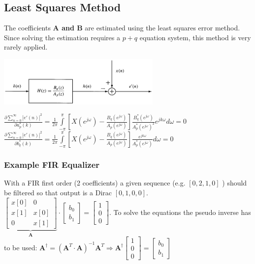 \subsection{Least Squares Method }
The coefficients \textbf{A and B} are estimated using the least squares error method.
Since solving the estimation requires a $p+q$ equation system, this method is very rarely applied.\\
\begin{minipage}{8cm}
	\includegraphics[width=8cm]{../TSM_StatDig/bilder/signalModeling.png}
\end{minipage}
\begin{minipage}{10cm}
$\frac{\partial \sum\limits_{n=0}^{\infty}|e'(n)|^2}{\partial a_p^*(k)}=\frac{1}{2\pi} \int\limits_{-\pi}^{\pi}\left[X(e^{j\omega})-
\frac{B_q(e^{j\omega})}{A_p (e^{j\omega})}\right]\frac{B^*_q(e^{j\omega})}{A_p^* (e^{j\omega})^2}e^{jk\omega} d\omega=0$\\
$\frac{\partial \sum\limits_{n=0}^{\infty}|e'(n)|^2}{\partial b_q^*(k)}=\frac{1}{2\pi} \int\limits_{-\pi}^{\pi}\left[X(e^{j\omega})-
\frac{B_q(e^{j\omega})}{A_p (e^{j\omega})}\right]\frac{e^{jk\omega}}{A_p^* (e^{j\omega})} d\omega=0$\\
\end{minipage} 
\subsubsection{Example FIR Equalizer}
With a FIR first order (2 coefficients) a given sequence (e.g. $[0, 2, 1, 0]$ ) should be filtered so that output is a Dirac $[0, 1 , 0 , 0]$.\\
$\underbrace{\begin{bmatrix}
x[0] 	& 0 	\\
x[1]	& x[0]	\\
0		& x[1]
\end{bmatrix}}_{\bm A}
\cdot \begin{bmatrix}
b_0\\
b_1
\end{bmatrix}=\begin{bmatrix}
1\\
0\\
0
\end{bmatrix}$. To solve the equations the pseudo inverse has to be used: $\bm A^{\dagger} = \left(\bm A^T \cdot \bm A\right)^{-1}\bm A^T 
\Rightarrow \bm  A^\dagger \begin{bmatrix}
1\\
0\\
0
\end{bmatrix}=\begin{bmatrix}
b_0\\
b_1
\end{bmatrix}$

